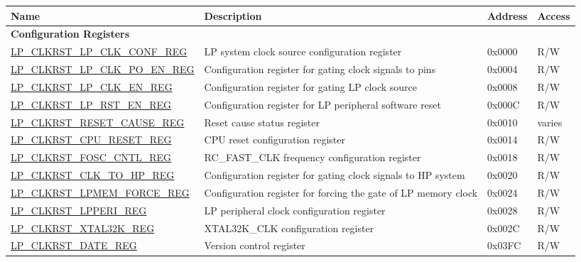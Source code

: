\begin{longtable}{ | p{6cm} | p{7.2cm} | p{1.3cm} | p{1cm} | }
\hline\rowcolor{lightgray}
\textbf{Name} & \textbf{Description} &  \textbf{Address} & \textbf{Access} \\ \hline
\endhead
\multicolumn{4}{|l|}{\textbf{Configuration Registers}} \\ \hline
\hyperref[regdesc:LPCLKRSTLPCLKCONFREG]{LP\_CLKRST\_LP\_CLK\_CONF\_REG} & LP system clock source configuration register & 0x0000 & R/W \\ \hline
\hyperref[regdesc:LPCLKRSTLPCLKPOENREG]{LP\_CLKRST\_LP\_CLK\_PO\_EN\_REG} & Configuration register for gating clock signals to pins & 0x0004 & R/W \\ \hline
\hyperref[regdesc:LPCLKRSTLPCLKENREG]{LP\_CLKRST\_LP\_CLK\_EN\_REG} & Configuration register for gating LP clock source & 0x0008 & R/W \\ \hline
\hyperref[regdesc:LPCLKRSTLPRSTENREG]{LP\_CLKRST\_LP\_RST\_EN\_REG} & Configuration register for LP peripheral software reset & 0x000C & R/W \\ \hline
\hyperref[regdesc:LPCLKRSTRESETCAUSEREG]{LP\_CLKRST\_RESET\_CAUSE\_REG} & Reset cause status register & 0x0010 & varies \\ \hline
\hyperref[regdesc:LPCLKRSTCPURESETREG]{LP\_CLKRST\_CPU\_RESET\_REG} & CPU reset configuration register & 0x0014 & R/W \\ \hline
\hyperref[regdesc:LPCLKRSTFOSCCNTLREG]{LP\_CLKRST\_FOSC\_CNTL\_REG} & RC\_FAST\_CLK frequency configuration register & 0x0018 & R/W \\ \hline
\hyperref[regdesc:LPCLKRSTCLKTOHPREG]{LP\_CLKRST\_CLK\_TO\_HP\_REG} &  Configuration register for gating clock signals to HP system & 0x0020 & R/W \\ \hline
\hyperref[regdesc:LPCLKRSTLPMEMFORCEREG]{LP\_CLKRST\_LPMEM\_FORCE\_REG} & Configuration register for forcing the gate of LP memory clock & 0x0024 & R/W \\ \hline
\hyperref[regdesc:LPCLKRSTLPPERIREG]{LP\_CLKRST\_LPPERI\_REG} & LP peripheral clock configuration register & 0x0028 & R/W \\ \hline
\hyperref[regdesc:LPCLKRSTXTAL32KREG]{LP\_CLKRST\_XTAL32K\_REG} & XTAL32K\_CLK configuration register & 0x002C & R/W \\ \hline
\hyperref[regdesc:LPCLKRSTDATEREG]{LP\_CLKRST\_DATE\_REG} & Version control register & 0x03FC & R/W \\ \hline
\end{longtable}
